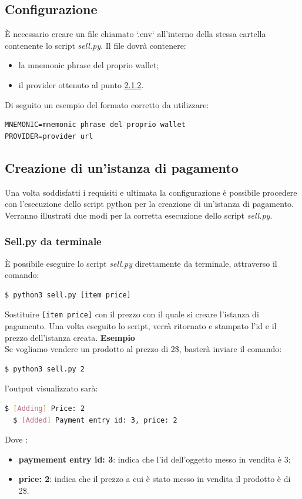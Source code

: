 \documentclass[a4paper, 12pt]{article}
\begin{document}
\subsection{Configurazione}
È necessario creare un file chiamato `.env` all'interno della stessa cartella contenente lo script \textit{sell.py}. Il file dovrà contenere:
\begin{itemize}
  \item la mnemonic phrase del proprio wallet;
  \item il provider ottenuto al punto \hyperref[sec:provider]{2.1.2}.
\end{itemize}
Di seguito un esempio del formato corretto da utilizzare:
\begin{verbatim}
MNEMONIC=mnemonic phrase del proprio wallet
PROVIDER=provider url
\end{verbatim}
\subsection{Creazione di un'istanza di pagamento}
Una volta soddisfatti i requisiti e ultimata la configurazione è possibile procedere con l'esecuzione dello script python per la creazione di un'istanza di pagamento. Verranno illustrati due modi per la corretta esecuzione dello script \textit{sell.py}.
\subsubsection{Sell.py da terminale}
È possibile eseguire lo script \textit{sell.py} direttamente da terminale, attraverso il comando:
\begin{lstlisting}[language=bash]
  $ python3 sell.py [item price]
\end{lstlisting}
Sostituire \verb|[item price]| con il prezzo con il quale si creare l'istanza di pagamento.
Una volta eseguito lo script, verrà ritornato e stampato l'id e il prezzo dell'istanza creata.
\textbf{Esempio}
\\
Se vogliamo vendere un prodotto al prezzo di 2\$, basterà inviare il comando:
\begin{lstlisting}[language=bash]
  $ python3 sell.py 2
\end{lstlisting}
l'output visualizzato sarà:
\begin{lstlisting}[language=bash]
  $ [Adding] Price: 2
  $ [Added] Payment entry id: 3, price: 2
\end{lstlisting}
Dove :
\begin{itemize}
  \item \textbf{paymement entry id: 3}: indica che l'id dell'oggetto messo in vendita è 3;
  \item \textbf{price: 2}: indica che il prezzo a cui è stato messo in vendita il prodotto è di 2\$.
\end{itemize}
\end{document}
